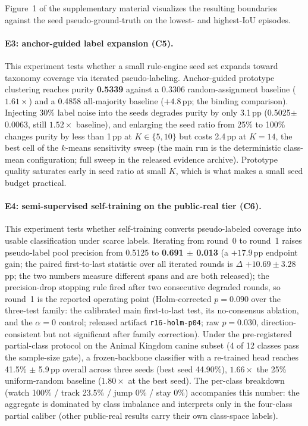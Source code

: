 Figure~1 of the supplementary material visualizes the resulting boundaries against the seed pseudo-ground-truth on the lowest- and highest-IoU episodes.

\paragraph{E3: anchor-guided label expansion (C5).}
This experiment tests whether a small rule-engine seed set expands toward taxonomy coverage via iterated pseudo-labeling. Anchor-guided prototype clustering reaches purity \textbf{0.5339} against a 0.3306 random-assignment baseline ($1.61\times$) and a 0.4858 all-majority baseline ($+4.8$\,pp; the binding comparison). Injecting 30\% label noise into the seeds degrades purity by only 3.1\,pp (0.5025$\pm$ 0.0063, still $1.52\times$ baseline), and enlarging the seed ratio from 25\% to 100\% changes purity by less than 1\,pp at $K\in\{5,10\}$ but costs 2.4\,pp at $K{=}14$, the best cell of the $k$-means sensitivity sweep (the main run is the deterministic class-mean configuration; full sweep in the released evidence archive). Prototype quality saturates early in seed ratio at small $K$, which is what makes a small seed budget practical.

\paragraph{E4: semi-supervised self-training on the public-real tier (C6).}
This experiment tests whether self-training converts pseudo-labeled coverage into usable classification under scarce labels. Iterating from round~0 to round~1 raises pseudo-label pool precision from 0.5125 to \textbf{0.691 $\pm$ 0.013} (a $+17.9$\,pp endpoint gain; the paired first-to-last statistic over all iterated rounds is $\Delta$ $+10.69\pm3.28$\,pp; the two numbers measure different spans and are both released); the precision-drop stopping rule fired after two consecutive degraded rounds, so round~1 is the reported operating point (Holm-corrected $p=0.090$ over the three-test family: the calibrated main first-to-last test, its no-consensus ablation, and the $\alpha{=}0$ control; released artifact \texttt{r16-holm-p04}; raw $p=0.030$, direction-consistent but not significant after family correction). Under the pre-registered partial-class protocol on the Animal Kingdom canine subset (4 of 12 classes pass the sample-size gate), a frozen-backbone classifier with a re-trained head reaches 41.5\% $\pm$ 5.9\,pp overall across three seeds (best seed 44.90\%), $1.66\times$ the 25\% uniform-random baseline ($1.80\times$ at the best seed). The per-class breakdown (watch 100\% / track 23.5\% / jump 0\% / stay 0\%) accompanies this number: the aggregate is dominated by class imbalance and interprets only in the four-class partial caliber (other public-real results carry their own class-space labels).

